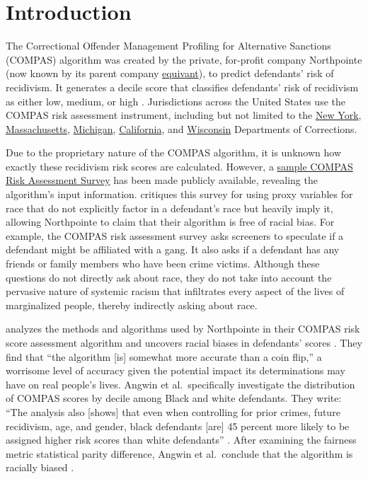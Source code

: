 \documentclass[,article,,moreauthors,pdftex]{mdpi}
\begin{document}

\hypertarget{introduction}{%
\section{Introduction}\label{introduction}}

The Correctional Offender Management Profiling for Alternative Sanctions
(COMPAS) algorithm was created by the private, for-profit company
Northpointe (now known by its parent company
\href{https://www.equivant.com/faq/}{equivant}), to predict defendants'
risk of recidivism. It generates a decile score that classifies
defendants' risk of recidivism as either low, medium, or high
\citep{angwin2016machine}. Jurisdictions across the United States use
the COMPAS risk assessment instrument, including but not limited to the
\href{https://doccs.ny.gov/system/files/documents/2020/11/8500.pdf}{New
York},
\href{https://hdsr.mitpress.mit.edu/pub/hzwo7ax4/release/4}{Massachusetts},
\href{https://hdsr.mitpress.mit.edu/pub/hzwo7ax4/release/4}{Michigan},
\href{https://hdsr.mitpress.mit.edu/pub/hzwo7ax4/release/4}{California},
and \href{https://doc.wi.gov/Pages/AboutDOC/COMPAS.aspx}{Wisconsin}
Departments of Corrections.

Due to the proprietary nature of the COMPAS algorithm, it is unknown how
exactly these recidivism risk scores are calculated. However, a
\href{https://www.documentcloud.org/documents/2702103-Sample-Risk-Assessment-COMPAS-CORE\#document/p5/a296598}{sample
COMPAS Risk Assessment Survey} has been made publicly available,
revealing the algorithm's input information. \citet{angwin2016machine}
critiques this survey for using proxy variables for race that do not
explicitly factor in a defendant's race but heavily imply it, allowing
Northpointe to claim that their algorithm is free of racial bias. For
example, the COMPAS risk assessment survey asks screeners to speculate
if a defendant might be affiliated with a gang. It also asks if a
defendant has any friends or family members who have been crime victims.
Although these questions do not directly ask about race, they do not
take into account the pervasive nature of systemic racism that
infiltrates every aspect of the lives of marginalized people, thereby
indirectly asking about race.

\citet{angwin2016machine} analyzes the methods and algorithms used by
Northpointe in their COMPAS risk score assessment algorithm and uncovers
racial biases in defendants' scores \citep{angwin2016machine}. They find
that ``the algorithm {[}is{]} somewhat more accurate than a coin flip,''
a worrisome level of accuracy given the potential impact its
determinations may have on real people's lives. Angwin et
al.~specifically investigate the distribution of COMPAS scores by decile
among Black and white defendants. They write: ``The analysis also
{[}shows{]} that even when controlling for prior crimes, future
recidivism, age, and gender, black defendants {[}are{]} 45 percent more
likely to be assigned higher risk scores than white defendants''
\citep{larson2016we}. After examining the fairness metric statistical
parity difference, Angwin et al.~conclude that the algorithm is racially
biased \citep{larson2016we}.
\end{document}
